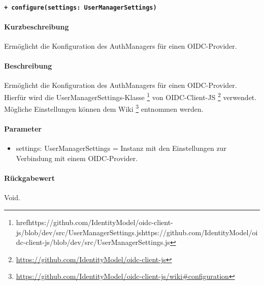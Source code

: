 \paragraph{\texttt{+ configure(settings: UserManagerSettings)}}\label{AP_Framework_configure}%
\paragraph*{Kurzbeschreibung}
Ermöglicht die Konfiguration des AuthManagers für einen OIDC-Provider.
\paragraph*{Beschreibung}
Ermöglicht die Konfiguration des AuthManagers für einen OIDC-Provider.
Hierfür wird die UserManagerSettings-Klasse \footnote{href{https://github.com/IdentityModel/oidc-client-js/blob/dev/src/UserManagerSettings.js}{https://github.com/IdentityModel/oidc-client-js/blob/dev/src/UserManagerSettings.js}} von 
OIDC-Client-JS \footnote{\href{https://github.com/IdentityModel/oidc-client-js}{https://github.com/IdentityModel/oidc-client-js}} verwendet.
Mögliche Einstellungen können dem Wiki \footnote{\href{https://github.com/IdentityModel/oidc-client-js/wiki\#configuration}{https://github.com/IdentityModel/oidc-client-js/wiki\#configuration}} entnommen werden.
\paragraph*{Parameter}
\begin{itemize}
    \item settings: UserManagerSettings = Instanz mit den Einstellungen zur Verbindung mit einem OIDC-Provider.
\end{itemize}
\paragraph*{Rückgabewert}
Void.